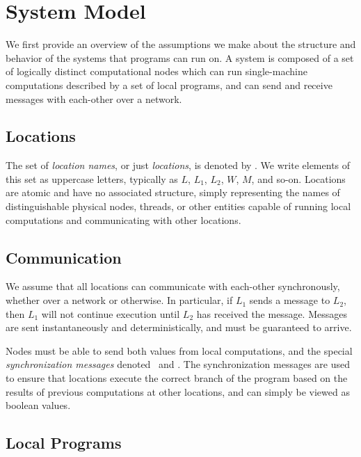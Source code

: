 \section{System Model}
\label{sec:system_model}
We first provide an overview of the assumptions we make about the structure and behavior of the systems that \langname{} programs can run on.
A system is composed of a set of logically distinct computational nodes which can run single-machine computations described by a set of local programs, and can send and receive messages with each-other over a network.

\subsection{Locations}
\label{sec:locations}
The set of \emph{location names}, or just \emph{locations}, is denoted by \Locations.
We write elements of this set as uppercase letters, typically as $L$, $L_1$, $L_2$, $W$, $M$, and so-on.
Locations are atomic and have no associated structure, simply representing the names of distinguishable physical nodes, threads, or other entities capable of running local computations and communicating with other locations.

\subsection{Communication}
\label{sec:communication}
We assume that all locations can communicate with each-other synchronously, whether over a network or otherwise.
In particular, if $L_1$ sends a message to $L_2$, then $L_1$ will not continue execution until $L_2$ has received the message.
Messages are sent instantaneously and deterministically, and must be guaranteed to arrive.

Nodes must be able to send both values from local computations, and the special \emph{synchronization messages} denoted \Left~and \Right.
The synchronization messages are used to ensure that locations execute the correct branch of the program based on the results of previous computations at other locations, and can simply be viewed as boolean values.

\subsection{Local Programs}
\label{sec:local-programs}

